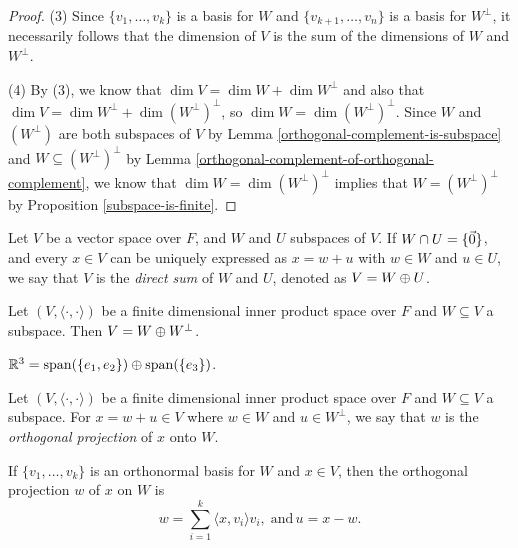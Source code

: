 \begin{proof}
    (3) Since $\{v_1, \ldots, v_k\}$ is a basis for $W$ and $\{v_{k+1}, \ldots, v_n\}$ is a basis for $W^{\perp}$, it necessarily follows that the dimension of $V$ is the sum of the dimensions of $W$ and $W^{\perp}$.

    (4) By (3), we know that $\dim V = \dim W + \dim W^{\perp}$ and also that $\dim V = \dim W^{\perp} + \dim\left(W^{\perp}\right)^{\perp}$, so $\dim W = \dim \left(W^{\perp}\right)^{\perp}$. Since $W$ and $\left(W^{\perp}\right)$ are both subspaces of $V$ by Lemma \ref{orthogonal-complement-is-subspace} and $W \subseteq \left(W^{\perp}\right)^{\perp}$ by Lemma \ref{orthogonal-complement-of-orthogonal-complement}, we know that $\dim W = \dim \left(W^{\perp}\right)^{\perp}$ implies that $W = \left(W^{\perp}\right)^{\perp}$ by Proposition \ref{subspace-is-finite}.
\end{proof}

\begin{defn}
    Let $V$ be a vector space over $F$, and $W$ and $U$ subspaces of $V$. If $W \cap U = \{\vec{0}\}$, and every $x \in V$ can be uniquely expressed as $x = w + u$ with $w \in W$ and $u \in U$, we say that $V$ is the \emph{direct sum} of $W$ and $U$, denoted as $V = W \oplus U$.
\end{defn}

\begin{exmp}
    Let $(V, \langle\cdot,\cdot\rangle)$ be a finite dimensional inner product space over $F$ and $W \subseteq V$ a subspace. Then $V = W \oplus W^{\perp}$.
\end{exmp}

\begin{exmp}
    $\mathbb{R}^3 = \operatorname{span}(\{e_1, e_2\}) \oplus \operatorname{span}(\{e_3\})$.
\end{exmp}

\begin{defn}
    Let $(V, \langle\cdot,\cdot\rangle)$ be a finite dimensional inner product space over $F$ and $W \subseteq V$ a subspace. For $x = w + u \in V$ where $w \in W$ and $u \in W^{\perp}$, we say that $w$ is the \emph{orthogonal projection} of $x$ onto $W$.
\end{defn}

\begin{rmk}
    If $\{v_1, \ldots, v_k\}$ is an orthonormal basis for $W$ and $x \in V$, then the orthogonal projection $w$ of $x$ on $W$ is
    \[w = \sum_{i=1}^{k}\langle x, v_i \rangle v_i, \;\textrm{and}\, u = x - w.\]
\end{rmk}


